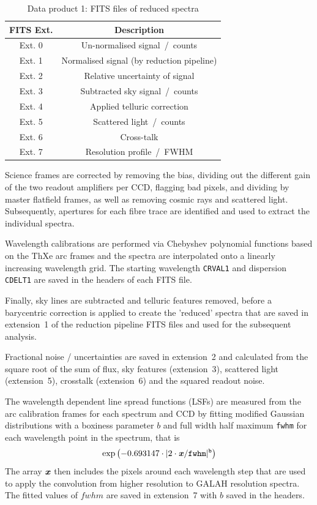 \documentclass[
  journal=pasa,
  manuscript=research-paper, %
  year=2023,
  volume=37
]{cup-journal}
\begin{document}
\begin{table}
    \centering
    \caption{Data product 1: FITS files of reduced spectra}
    \label{tab:reduction_fits}
    \begin{tabular}{cc}
    \hline \hline
    FITS Ext. & Description \\
    \hline
    Ext. 0 & Un-normalised signal~/~counts \\
    Ext. 1 & Normalised signal (by reduction pipeline) \\
    Ext. 2 & Relative uncertainty of signal \\
    Ext. 3 & Subtracted sky signal~/~counts \\
    Ext. 4 & Applied telluric correction \\
    Ext. 5 & Scattered light~/~counts \\
    Ext. 6 & Cross-talk \\
    Ext. 7 & Resolution profile~/~FWHM \\
    \hline
    \end{tabular}
\end{table}

Science frames are corrected by removing the bias, dividing out the different gain of the two readout amplifiers per CCD, flagging bad pixels, and dividing by master flatfield frames, as well as removing cosmic rays and scattered light. Subsequently, apertures for each fibre trace are identified and used to extract the individual spectra. 

Wavelength calibrations are performed via Chebyshev polynomial functions based on the ThXe arc frames and the spectra are interpolated onto a linearly increasing wavelength grid. The starting wavelength \texttt{CRVAL1} and dispersion \texttt{CDELT1} are saved in the headers of each FITS file.

Finally, sky lines are subtracted and telluric features removed, before a barycentric correction is applied to create the 'reduced' spectra that are saved in extension~1 of the reduction pipeline FITS files and used for the subsequent analysis. 

Fractional noise / uncertainties are saved in extension~2 and calculated from the square root of the sum of flux, sky features (extension~3), scattered light (extension~5), crosstalk (extension~6) and the squared readout noise.

The wavelength dependent line spread functions (LSFs) are measured from the arc calibration frames for each spectrum and CCD by fitting modified Gaussian distributions with a boxiness parameter $b$ and full width half maximum \texttt{fwhm} for each wavelength point in the spectrum, that is
\begin{align}
    \exp \left(-0.693147 \cdot \vert 2 \cdot \textbf{\textit{x}}/\texttt{fwhm} \vert^\texttt{b}\right) \label{eq:lsf}
\end{align}
The array $\textbf{\textit{x}}$ then includes the pixels around each wavelength step that are used to apply the convolution from higher resolution to GALAH resolution spectra. The fitted values of $fwhm$ are saved in extension~7 with $b$ saved in the headers.
\end{document}
